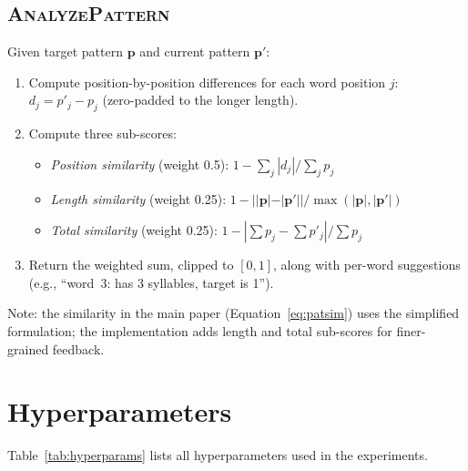 \documentclass[11pt]{article}
\begin{document}
\subsection{\textsc{AnalyzePattern}}

Given target pattern $\mathbf{p}$ and current pattern $\mathbf{p}'$:
\begin{enumerate}
    \item Compute position-by-position differences for each word position $j$: $d_j = p'_j - p_j$ (zero-padded to the longer length).
    \item Compute three sub-scores:
    \begin{itemize}
        \item \emph{Position similarity} (weight 0.5): $1 - \sum_j |d_j| / \sum_j p_j$
        \item \emph{Length similarity} (weight 0.25): $1 - ||\mathbf{p}| - |\mathbf{p}'|| / \max(|\mathbf{p}|, |\mathbf{p}'|)$
        \item \emph{Total similarity} (weight 0.25): $1 - |\sum p_j - \sum p'_j| / \sum p_j$
    \end{itemize}
    \item Return the weighted sum, clipped to $[0, 1]$, along with per-word suggestions (e.g., ``word~3: has 3 syllables, target is 1'').
\end{enumerate}

Note: the similarity in the main paper (Equation~\ref{eq:patsim}) uses the simplified formulation; the implementation adds length and total sub-scores for finer-grained feedback.


\section{Hyperparameters}
\label{app:hyperparams}

Table~\ref{tab:hyperparams} lists all hyperparameters used in the experiments.
\end{document}
